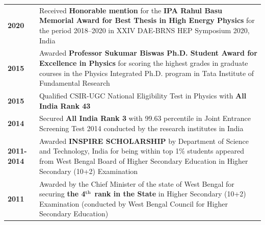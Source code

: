 \documentclass[a4paper,11pt]{article}
\begin{document}
\begin{tabular}{ p{2cm} p{13cm} }
\textbf{2020} & {Received \textbf{Honorable mention} for the \textbf{IPA Rahul Basu Memorial Award for Best Thesis in High Energy Physics} for the period 2018--2020 in XXIV DAE-BRNS HEP Symposium 2020, India} \\
\textbf{2015} & {Awarded \textbf{Professor Sukumar Biswas Ph.D. Student Award for Excellence in Physics} for scoring the highest grades in graduate courses in the Physics Integrated Ph.D. program in Tata Institute of Fundamental Research} \\
\textbf{2015} \ & Qualified CSIR-UGC National Eligibility Test in Physics with \textbf{All India Rank 43} \\
\textbf{2014} \ & Secured \textbf{All India Rank 3} with 99.63 percentile in Joint Entrance Screening Test 2014 conducted by the research institutes in India  \\
\textbf{2011-2014} \ &  Awarded \textbf{INSPIRE SCHOLARSHIP} by Department of Science and Technology, India for being within top 1\% students appeared from West Bengal Board of Higher Secondary Education in Higher Secondary (10+2) Examination \\
\textbf{2011} \ & Awarded by the Chief Minister of the state of West Bengal for securing \textbf{the 4$^{\rm{th}}$ rank in the State} in Higher Secondary (10+2) Examination (conducted by West Bengal Council for Higher Secondary Education)  \\
\end{tabular}
\end{document}
